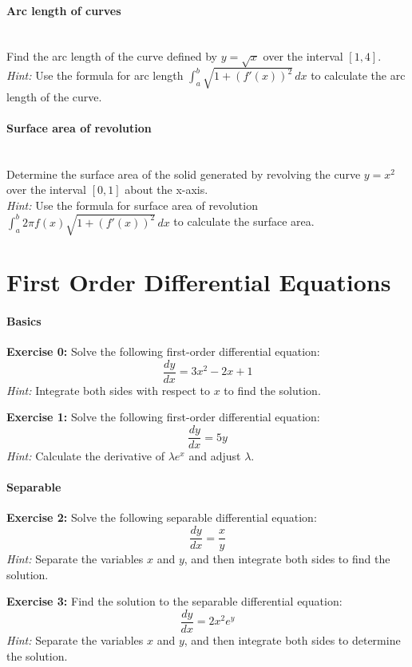 \documentclass[]{article}
\begin{document}
	\paragraph{Arc length of curves}\mbox{}\\
	Find the arc length of the curve defined by \(y = \sqrt{x}\) over the interval \([1, 4]\).\\
	\textit{Hint:} Use the formula for arc length \(\int_a^b \sqrt{1 + (f'(x))^2} \, dx\) to calculate the arc length of the curve.
	
	\paragraph{Surface area of revolution}\mbox{}\\
	Determine the surface area of the solid generated by revolving the curve \(y = x^2\) over the interval \([0, 1]\) about the x-axis.\\
	\textit{Hint:} Use the formula for surface area of revolution \(\int_a^b 2\pi f(x) \sqrt{1 + (f'(x))^2} \, dx\) to calculate the surface area.
	
	
	\section{First Order Differential Equations}
	\paragraph{Basics}\mbox{}
	
	\textbf{Exercise 0:}
	Solve the following first-order differential equation:
	\[
	\frac{dy}{dx} = 3x^2 - 2x + 1
	\]
	\textit{Hint:} Integrate both sides with respect to \(x\) to find the solution.
	
	\textbf{Exercise 1:}
	Solve the following first-order differential equation:
	\[
	\frac{dy}{dx} = 5y
	\]
	\textit{Hint:} Calculate the derivative of $\lambda e^x$ and adjust $\lambda$.
	
	\paragraph{Separable}\mbox{}
	
	\textbf{Exercise 2:}
	Solve the following separable differential equation:
	\[
	\frac{dy}{dx} = \frac{x}{y}
	\]
	\textit{Hint:} Separate the variables \(x\) and \(y\), and then integrate both sides to find the solution.
	
	\textbf{Exercise 3:}
	Find the solution to the separable differential equation:
	\[
	\frac{dy}{dx} = 2x^2 e^y
	\]
	\textit{Hint:} Separate the variables \(x\) and \(y\), and then integrate both sides to determine the solution.
	
\end{document}
